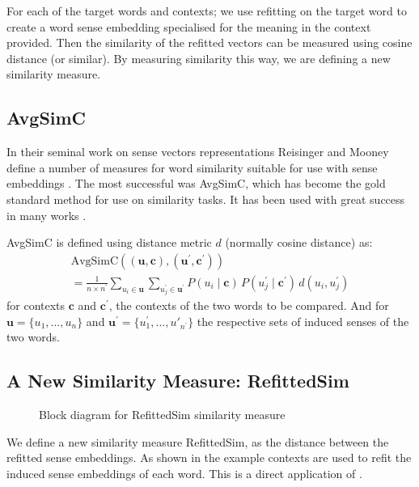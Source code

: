 \documentclass{article}
\def\parencite{\cite}
\renewcommand{\c}{\mathbf{c}}
\renewcommand{\u}{\mathbf{u}}
\begin{document}
For each of the target words and contexts; we use refitting on the target word to create a word sense embedding specialised for the meaning in the context provided.
Then the similarity of the refitted vectors can be measured using cosine distance (or similar).
By measuring similarity this way, we are defining a new similarity measure.

\subsection{AvgSimC}
In their seminal work on sense vectors representations Reisinger and Mooney define a number of measures for word similarity suitable for use with sense embeddings \parencite{Reisinger2010}.
The most successful was AvgSimC, which has become the gold standard method for use on similarity tasks. It has been used with great success in many works \cite{Huang2012,Chen2014,tian2014probabilistic}. 


AvgSimC is defined using distance metric $d$ (normally cosine distance) as: 
\begin{multline} \label{eq:avgsimc}
\mathrm{AvgSimC}((\u,\c),(\u^{\prime},\c^{\prime})) \\
=  \frac{1}{n \times n^{\prime}}
\sum_{u_{i}\in\u}
\sum_{u_{j}^{\prime}\in\u^{\prime}}
P(u_{i}\mid\c)\,P(u_{j}^{\prime}\mid\c^{\prime})\,d(u_{i},u_{j}^{\prime})
\end{multline}
for contexts $\c$ and $\c^\prime$, the contexts of the two words to be compared.
And for $\u=\{u_1,...,u_n\}$ and $\u^\prime=\{u^\prime_1,...,u\prime_{n^\prime}\}$ the respective sets of induced senses of the two words.


\subsection{A New Similarity Measure: RefittedSim}\label{RefittedSimVsAvgSimC}
\begin{figure}
	\begin{adjustbox}{max width=\columnwidth}
	
	\end{adjustbox}
	\caption{Block diagram for RefittedSim similarity measure} \label{diaRefittedSim}
\end{figure}
We define a new similarity measure RefittedSim, as the distance between the refitted sense embeddings.
As shown in  the example contexts are used to refit the induced sense embeddings of each word.
This is a direct application of  .
\end{document}
